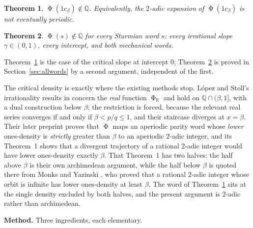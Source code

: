 \documentclass[11pt,reqno]{amsart}
\theoremstyle{plain}
\newtheorem{theorem}{Theorem}[section]
\theoremstyle{definition}
\newcommand{\Q}{\mathbb{Q}}
\newcommand{\R}{\mathbb{R}}
\DeclareMathOperator{\Ph}{\Phi}
\begin{document}
\begin{theorem}\label{thm:main-intro}
$\Ph(1c_\beta)\notin\Q$. Equivalently, the $2$-adic expansion of $\Ph(1c_\beta)$
is not eventually periodic.
\end{theorem}

\begin{theorem}\label{thm:allwords-intro}
$\Ph(s)\notin\Q$ for every Sturmian word $s$: every irrational slope
$\gamma\in(0,1)$, every intercept, and both mechanical words.
\end{theorem}

Theorem~\ref{thm:main-intro} is the case of the critical slope at intercept $0$;
Theorem~\ref{thm:allwords-intro} is proved in Section~\ref{sec:allwords} by a
second argument, independent of the first.

The critical density is exactly where the existing methods stop. L\'opez and
Stoll's irrationality results in \cite{LopezStoll2009} concern the \emph{real}
function $\Ph_\R$ and hold on $\Q\cap(\beta,1]$, with a dual construction below
$\beta$; the restriction is forced, because the relevant real series converges if
and only if $\beta<p/q\le 1$, and their staircase diverges at $x=\beta$. Their
later preprint \cite{LopezStoll2021} proves that $\Ph$ maps an aperiodic parity
word whose \emph{lower} ones-density is \emph{strictly} greater than $\beta$ to
an aperiodic $2$-adic integer, and its Theorem~1 shows that a divergent
trajectory of a rational $2$-adic integer would have lower ones-density exactly
$\beta$. That Theorem~1 has two halves: the half above $\beta$ is their own
archimedean argument, while the half below $\beta$ is quoted there
\cite[p.~6]{LopezStoll2021} from Monks and Yazinski
\cite[Theorem~2.7(b)]{MonksYazinski2004}, who proved that a rational $2$-adic
integer whose orbit is infinite has lower ones-density at least $\beta$. The
word of Theorem~\ref{thm:main-intro} sits at the single density excluded by
both halves, and the present argument is $2$-adic rather than archimedean.

\medskip
\noindent\textbf{Method.} Three ingredients, each elementary.
\end{document}
